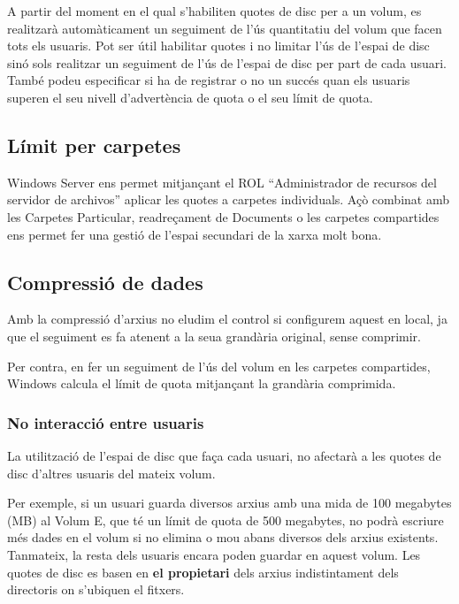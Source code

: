 \documentclass[
  a4paper,
]{article}
\begin{document}
A partir del moment en el qual s'habiliten quotes de disc per a un
volum, es realitzarà automàticament un seguiment de l'ús quantitatiu del
volum que facen tots els usuaris. Pot ser útil habilitar quotes i no
limitar l'ús de l'espai de disc sinó sols realitzar un seguiment de l'ús
de l'espai de disc per part de cada usuari. També podeu especificar si
ha de registrar o no un succés quan els usuaris superen el seu nivell
d'advertència de quota o el seu límit de quota.

\subsection{Límit per carpetes}\label{luxedmit-per-carpetes}

Windows Server ens permet mitjançant el ROL ``Administrador de recursos
del servidor de archivos'' aplicar les quotes a carpetes individuals.
Açò combinat amb les Carpetes Particular, readreçament de Documents o
les carpetes compartides ens permet fer una gestió de l'espai secundari
de la xarxa molt bona.

\subsection{Compressió de dades}\label{compressiuxf3-de-dades}

Amb la compressió d'arxius no eludim el control si configurem aquest en
local, ja que el seguiment es fa atenent a la seua grandària original,
sense comprimir.

Per contra, en fer un seguiment de l'ús del volum en les carpetes
compartides, Windows calcula el límit de quota mitjançant la grandària
comprimida.

\subsubsection{No interacció entre
usuaris}\label{no-interacciuxf3-entre-usuaris}

La utilització de l'espai de disc que faça cada usuari, no afectarà a
les quotes de disc d'altres usuaris del mateix volum.

Per exemple, si un usuari guarda diversos arxius amb una mida de 100
megabytes (MB) al Volum E, que té un límit de quota de 500 megabytes, no
podrà escriure més dades en el volum si no elimina o mou abans diversos
dels arxius existents. Tanmateix, la resta dels usuaris encara poden
guardar en aquest volum. Les quotes de disc es basen en \textbf{el
propietari} dels arxius indistintament dels directoris on s'ubiquen el
fitxers.
\end{document}
